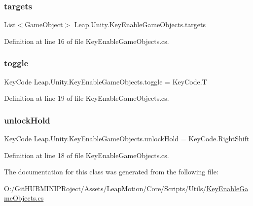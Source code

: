 \subsubsection{\texorpdfstring{targets}{targets}}
{\footnotesize\ttfamily List$<$Game\+Object$>$ Leap.\+Unity.\+Key\+Enable\+Game\+Objects.\+targets}



Definition at line 16 of file Key\+Enable\+Game\+Objects.\+cs.

\mbox{\label{class_leap_1_1_unity_1_1_key_enable_game_objects_ae90db079d50d4bc1e7e678eab1fab5fd}} 
\subsubsection{\texorpdfstring{toggle}{toggle}}
{\footnotesize\ttfamily Key\+Code Leap.\+Unity.\+Key\+Enable\+Game\+Objects.\+toggle = Key\+Code.\+T}



Definition at line 19 of file Key\+Enable\+Game\+Objects.\+cs.

\mbox{\label{class_leap_1_1_unity_1_1_key_enable_game_objects_a7b1409a340cf247957646c6d0bb3cb88}} 
\subsubsection{\texorpdfstring{unlockHold}{unlockHold}}
{\footnotesize\ttfamily Key\+Code Leap.\+Unity.\+Key\+Enable\+Game\+Objects.\+unlock\+Hold = Key\+Code.\+Right\+Shift}



Definition at line 18 of file Key\+Enable\+Game\+Objects.\+cs.



The documentation for this class was generated from the following file\+:\begin{DoxyCompactItemize}
\item 
O\+:/\+Git\+H\+U\+B\+M\+I\+N\+I\+P\+Roject/\+Assets/\+Leap\+Motion/\+Core/\+Scripts/\+Utils/\mbox{\hyperlink{_key_enable_game_objects_8cs}{Key\+Enable\+Game\+Objects.\+cs}}\end{DoxyCompactItemize}
